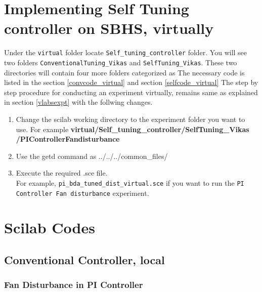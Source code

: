 \section{Implementing Self Tuning controller on SBHS, virtually}
Under the {\tt virtual} folder locate {\tt Self\_tuning\_controller} folder. You will see two folders {\tt ConventionalTuning\_Vikas} and {\tt SelfTuning\_Vikas}. These two directories will contain four more folders categorized as 
The necessary code is listed in the section \ref{convcode_virtual} and section \ref{selfcode_virtual}
The step by step procedure for conducting an experiment virtually, remains same as explained in section \ref{vlabsexpt} with the follwing changes.
\begin{enumerate}
\item Change the scilab working directory to the experiment folder you want to use. For example {\bf virtual/Self\_tuning\_controller/SelfTuning\_Vikas\\/PIControllerFandisturbance}
\item Use the getd command as ../../../common\_files/
\item Execute the required .sce file. \\For example, {\tt pi\_bda\_tuned\_dist\_virtual.sce} if you want to run the {\tt PI Controller Fan disturbance} experiment.  

\end{enumerate}
 


\section{Scilab Codes}
\begin{code}

\end{code}


\subsection{Conventional Controller, local}\label{convcode_local}
\subsubsection{Fan Disturbance in PI Controller}
\begin{code}

\end{code}


